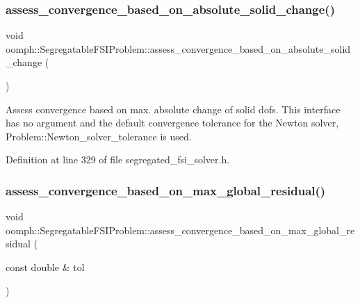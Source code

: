 \subsubsection{\texorpdfstring{assess\+\_\+convergence\+\_\+based\+\_\+on\+\_\+absolute\+\_\+solid\+\_\+change()}{assess\_convergence\_based\_on\_absolute\_solid\_change()}\hspace{0.1cm}{\footnotesize\ttfamily [2/2]}}
{\footnotesize\ttfamily void oomph\+::\+Segregatable\+F\+S\+I\+Problem\+::assess\+\_\+convergence\+\_\+based\+\_\+on\+\_\+absolute\+\_\+solid\+\_\+change (\begin{DoxyParamCaption}{ }\end{DoxyParamCaption})\hspace{0.3cm}{\ttfamily [inline]}}



Assess convergence based on max. absolute change of solid dofs. This interface has no argument and the default convergence tolerance for the Newton solver, Problem\+::\+Newton\+\_\+solver\+\_\+tolerance is used. 



Definition at line 329 of file segregated\+\_\+fsi\+\_\+solver.\+h.

\mbox{\label{classoomph_1_1SegregatableFSIProblem_a88eb2704f55c89db093cc2857490b727}} 
\subsubsection{\texorpdfstring{assess\+\_\+convergence\+\_\+based\+\_\+on\+\_\+max\+\_\+global\+\_\+residual()}{assess\_convergence\_based\_on\_max\_global\_residual()}\hspace{0.1cm}{\footnotesize\ttfamily [1/2]}}
{\footnotesize\ttfamily void oomph\+::\+Segregatable\+F\+S\+I\+Problem\+::assess\+\_\+convergence\+\_\+based\+\_\+on\+\_\+max\+\_\+global\+\_\+residual (\begin{DoxyParamCaption}\item[{const double \&}]{tol }\end{DoxyParamCaption})\hspace{0.3cm}{\ttfamily [inline]}}



